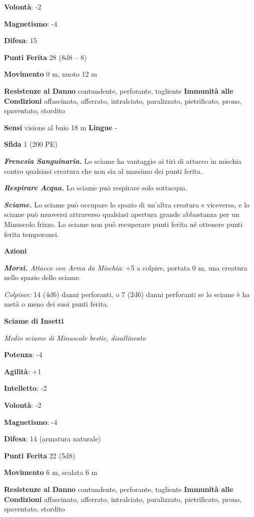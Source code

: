 \begin{multicols}{2}
\textbf{Volontà}: -2

\textbf{Magnetismo}: -4

\textbf{Difesa}: 15

\textbf{Punti Ferita} 28 (8d8 -- 8)

\textbf{Movimento} 0 m, nuoto 12 m

\textbf{Resistenze al Danno} contundente, perforante, tagliente
\textbf{Immunità alle Condizioni} affascinato, afferrato, intralciato,
paralizzato, pietrificato, prono, spaventato, stordito

\textbf{Sensi} visione al buio 18 m
\textbf{Lingue} -

\textbf{Sfida} 1 (200 PE)

\emph{\textbf{Frenesia Sanguinaria.}} Lo sciame ha vantaggio ai tiri di
attacco in mischia contro qualsiasi creatura che non sia al massimo dei
punti ferita.

\emph{\textbf{Respirare Acqua.}} Lo sciame può respirare solo sottacqua.

\emph{\textbf{Sciame.}} Lo sciame può occupare lo spazio di un'altra
creatura e viceversa, e lo sciame può muoversi attraverso qualsiasi
apertura grande abbastanza per un Minuscolo frizzo. Lo sciame non può
recuperare punti ferita né ottenere punti ferita temporanei.

\textbf{Azioni}

\emph{\textbf{Morsi.} Attacco con Arma da Mischia}: +5 a colpire,
portata 0 m, una creatura nello spazio dello sciame.

\emph{Colpisce:} 14 (4d6) danni perforanti, o 7 (2d6) danni perforanti
se lo sciame è ha metà o meno dei suoi punti ferita.

\textbf{Sciame di Insetti}

\emph{Medio sciame di Minuscole bestie, disallineato}

\textbf{Potenza}: -4

\textbf{Agilità}: +1

\textbf{Intelletto}: -2

\textbf{Volontà}: -2

\textbf{Magnetismo}: -4

\textbf{Difesa}: 14 (armatura naturale)

\textbf{Punti Ferita} 22 (5d8)

\textbf{Movimento} 6 m, scalata 6 m

\textbf{Resistenze al Danno} contundente, perforante, tagliente
\textbf{Immunità alle Condizioni} affascinato, afferrato, intralciato,
paralizzato, pietrificato, prono, spaventato, stordito


\end{multicols}
